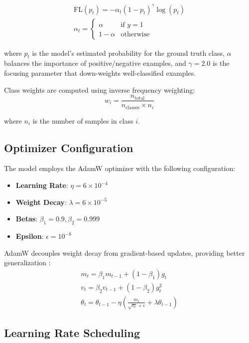 \begin{align}
\text{FL}(p_t) = -\alpha_t(1-p_t)^{\gamma}\log(p_t) \\
\alpha_t = \begin{cases} 
\alpha & \text{if } y = 1 \\
1-\alpha & \text{otherwise}
\end{cases}
\end{align}

where $p_t$ is the model's estimated probability for the ground truth class, $\alpha$ balances the importance of positive/negative examples, and $\gamma = 2.0$ is the focusing parameter that down-weights well-classified examples.

Class weights are computed using inverse frequency weighting:
\begin{equation}
w_i = \frac{n_{\text{total}}}{n_{\text{classes}} \times n_i}
\end{equation}

where $n_i$ is the number of samples in class $i$.

\subsection{Optimizer Configuration}
\label{subsec:optimizer}

The model employs the AdamW optimizer \citep{loshchilov2019decoupled} with the following configuration:

\begin{itemize}
    \item \textbf{Learning Rate}: $\eta = 6 \times 10^{-4}$
    \item \textbf{Weight Decay}: $\lambda = 6 \times 10^{-5}$
    \item \textbf{Betas}: $\beta_1 = 0.9, \beta_2 = 0.999$
    \item \textbf{Epsilon}: $\epsilon = 10^{-8}$
\end{itemize}

AdamW decouples weight decay from gradient-based updates, providing better generalization \citep{loshchilov2019decoupled}:
\begin{align}
m_t = \beta_1 m_{t-1} + (1-\beta_1)g_t \\
v_t = \beta_2 v_{t-1} + (1-\beta_2)g_t^2 \\
\theta_t = \theta_{t-1} - \eta\left(\frac{m_t}{\sqrt{v_t} + \epsilon} + \lambda\theta_{t-1}\right)
\end{align}

\subsection{Learning Rate Scheduling}
\label{subsec:lr_scheduling}

